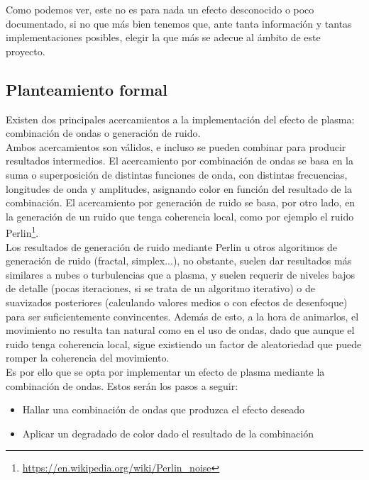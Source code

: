Como podemos ver, este no es para nada un efecto desconocido o poco documentado, si no que más bien tenemos que, ante tanta información y tantas implementaciones posibles, elegir la que más se adecue al ámbito de este proyecto.

\subsection{Planteamiento formal}

Existen dos principales acercamientos a la implementación del efecto de plasma: combinación de ondas o generación de ruido.\\

Ambos acercamientos son válidos, e incluso se pueden combinar para producir resultados intermedios. El acercamiento por combinación de ondas se basa en la suma o superposición de distintas funciones de onda, con distintas frecuencias, longitudes de onda y amplitudes, asignando color en función del resultado de la combinación. El acercamiento por generación de ruido se basa, por otro lado, en la generación de un ruido que tenga coherencia local, como por ejemplo el ruido Perlin\footnote{\url{https://en.wikipedia.org/wiki/Perlin_noise}}.\\

Los resultados de generación de ruido mediante Perlin u otros algoritmos de generación de ruido (fractal, simplex...), no obstante, suelen dar resultados más similares a nubes o turbulencias que a plasma, y suelen requerir de niveles bajos de detalle (pocas iteraciones, si se trata de un algoritmo iterativo) o de suavizados posteriores (calculando valores medios o con efectos de desenfoque) para ser suficientemente convincentes. Además de esto, a la hora de animarlos, el movimiento no resulta tan natural como en el uso de ondas, dado que aunque el ruido tenga coherencia local, sigue existiendo un factor de aleatoriedad que puede romper la coherencia del movimiento.\\

Es por ello que se opta por implementar un efecto de plasma mediante la combinación de ondas. Estos serán los pasos a seguir:

\begin{itemize}
	\item Hallar una combinación de ondas que produzca el efecto deseado
	\item Aplicar un degradado de color dado el resultado de la combinación
\end{itemize}

